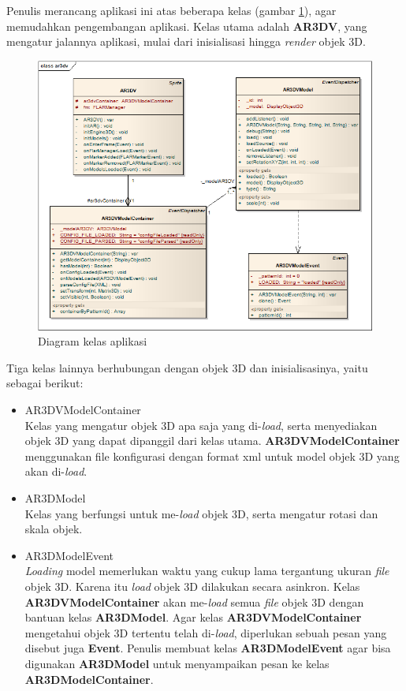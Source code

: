 Penulis merancang aplikasi ini atas beberapa kelas (gambar \ref{fig:diagram_kelas}), agar memudahkan pengembangan aplikasi. Kelas utama adalah \textbf{AR3DV}, yang mengatur jalannya aplikasi, mulai dari inisialisasi hingga \textit{render} objek 3D. 

\begin{figure}[h]
\begin{center}
\includegraphics[width=14cm]{./images/class}
\caption{\label{fig:diagram_kelas} Diagram kelas aplikasi}
\end{center}
\end{figure}

Tiga kelas lainnya berhubungan dengan objek 3D dan inisialisasinya, yaitu sebagai berikut:
\begin{itemize}
\item AR3DVModelContainer\\
Kelas yang mengatur objek 3D apa saja yang di-\textit{load}, serta menyediakan objek 3D yang dapat dipanggil dari kelas utama. \textbf{AR3DVModelContainer} menggunakan file konfigurasi dengan format xml untuk model objek 3D yang akan di-\textit{load}.
\item AR3DModel\\
Kelas yang berfungsi untuk me-\textit{load} objek 3D, serta mengatur rotasi dan skala objek.
\item AR3DModelEvent\\
\textit{Loading} model memerlukan waktu yang cukup lama tergantung ukuran \textit{file} objek 3D. Karena itu \textit{load} objek 3D dilakukan secara asinkron. Kelas \textbf{AR3DVModelContainer} akan me-\textit{load} semua \textit{file} objek 3D dengan bantuan kelas \textbf{AR3DModel}. Agar kelas \textbf{AR3DVModelContainer} mengetahui objek 3D tertentu telah di-\textit{load}, diperlukan sebuah pesan yang disebut juga \textbf{Event}. Penulis membuat kelas \textbf{AR3DModelEvent} agar bisa digunakan \textbf{AR3DModel} untuk menyampaikan pesan ke kelas \textbf{AR3DModelContainer}.
\end{itemize}

